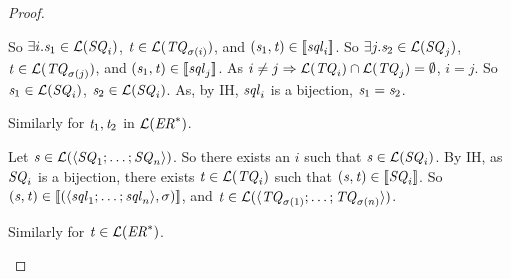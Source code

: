 \documentclass[numbers,10pt,preprint\ifanon ,nocopyrightspace\fi]{sigplanconf}
\begin{document}
\begin{proof}
\begin{case}[\DNFLensType{}]
    So $\exists i.\mathit{s}_1 \in \mathcal{L}(\mathit{SQ}_i)$,
    $\mathit{t} \in \mathcal{L}(\mathit{TQ}_{\sigma(i)})$, and
    $(\mathit{s}_1,\mathit{t}) \in [ \! [\mathit{sql}_i] \! ]$.
    So $\exists j.\mathit{s}_2 \in \mathcal{L}(\mathit{SQ}_j)$,
    $\mathit{t} \in \mathcal{L}(\mathit{TQ}_{\sigma(j)})$, and
    $(\mathit{s}_1,\mathit{t}) \in [ \! [\mathit{sql}_j] \! ]$.
    As
    $i \neq j \Rightarrow \mathcal{L}(\mathit{TQ}_{i}) \cap
    \mathcal{L}(\mathit{TQ}_{j})=\emptyset$, $i = j$.
    So $\mathit{s}_1 \in \mathcal{L}(\mathit{SQ}_i)$, $\mathit{s}_2 \in
    \mathcal{L}(\mathit{SQ}_i)$.
    As, by IH, $\mathit{sql}_i$ is a bijection,
    $\mathit{s}_1 = \mathit{s}_2$.

    Similarly for $\mathit{t}_1,\mathit{t}_2$ in
    $\mathcal{L}({\mathit{ER}}^*)$.

    Let $\mathit{s}\in\mathcal{L}(\langle\mathit{SQ}_1;\ldots;\mathit{SQ}_n\rangle)$.
    So there exists an $i$ such that $\mathit{s} \in \mathcal{L}(\mathit{SQ}_i)$.
    By IH, as $\mathit{SQ}_i$ is a bijection, there exists $\mathit{t}\in\mathcal{L}(\mathit{TQ}_i)$ such that
    $(\mathit{s},\mathit{t}) \in [ \! [\mathit{SQ}_i] \! ]$.
    So
    $(\mathit{s},\mathit{t}) \in
    [ \! [(\langle\mathit{sql}_1;\ldots;\mathit{sql}_n\rangle,\sigma)] \! ]$,
    and $\mathit{t} \in
    \mathcal{L}(\langle\mathit{TQ}_{\sigma(1)};\ldots;\mathit{TQ}_{\sigma(n)}\rangle)$. 

    Similarly for $\mathit{t} \in \mathcal{L}({\mathit{ER}}^*)$.
  \end{case}
\end{proof}
\end{document}
